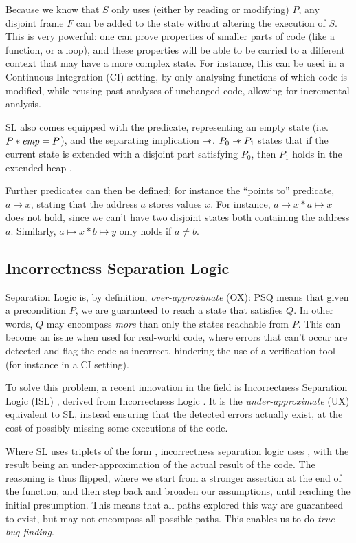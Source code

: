 Because we know that $S$ only uses (either by reading or modifying) $P$, any disjoint frame $F$ can be added to the state without altering the execution of $S$. This is very powerful: one can prove properties of smaller parts of code (like a function, or a loop), and these properties will be able to be carried to a different context that may have a more complex state. For instance, this can be used in a Continuous Integration (CI) setting, by only analysing functions of which code is modified, while reusing past analyses of unchanged code, allowing for incremental analysis.

SL also comes equipped with the \emp{} predicate, representing an empty state (i.e. ${P * \textit{emp} = P}$), and the separating implication $\mathrel{-\!\!\ast}$. $P_0 \mathrel{-\!\!\ast} P_1$ states that if the current state is extended with a disjoint part satisfying $P_0$, then $P_1$ holds in the extended heap \cite{seplogic2}.

Further predicates can then be defined; for instance the ``points to'' predicate, $a \mapsto x$, stating that the address $a$ stores values $x$. For instance, $a \mapsto x * a \mapsto x$ does not hold, since we can't have two disjoint states both containing the address $a$. Similarly, $a\mapsto x * b \mapsto y$ only holds if $a\neq b$.

\subsection{Incorrectness Separation Logic}

Separation Logic is, by definition, \emph{over-approximate} (OX): \SLtriple PSQ means that given a precondition $P$, we are guaranteed to reach a state that satisfies $Q$. In other words, $Q$ may encompass \emph{more} than only the states reachable from $P$. This can become an issue when used for real-world code, where errors that can't occur are detected and flag the code as incorrect, hindering the use of a verification tool (for instance in a CI setting).

To solve this problem, a recent innovation in the field is Incorrectness Separation Logic (ISL) \cite{isl}, derived from Incorrectness Logic \cite{incorrectnesslogic}. It is the \emph{under-approximate} (UX) equivalent to SL, instead ensuring that the detected errors actually exist, at the cost of possibly missing some executions of the code.

Where SL uses triplets of the form , incorrectness separation logic uses , with the result being an under-approximation of the actual result of the code. The reasoning is thus flipped, where we start from a stronger assertion at the end of the function, and then step back and broaden our assumptions, until reaching the initial presumption. This means that all paths explored this way are guaranteed to exist, but may not encompass all possible paths. This enables us to do \emph{true bug-finding}. 


